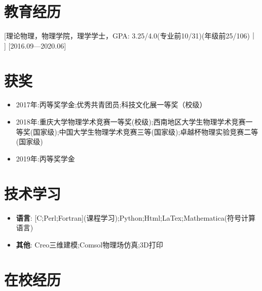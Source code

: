 \documentclass{resume}
\begin{document}


\ResumeTitle


\section{教育经历}

[\textnormal{理论物理，物理学院，理学学士，GPA: 3.25/4.0\small{(专业前10/31)(年级前25/106)}}｜ ]   [2016.09—2020.06]

\section{获奖}
\begin{itemize}
  \item 2017年:丙等奖学金;优秀共青团员;科技文化展一等奖（校级）
  \item 2018年:重庆大学物理学术竞赛一等奖(校级);西南地区大学生物理学术竞赛一等奖(国家级);中国大学生物理学术竞赛三等(国家级);卓越杯物理实验竞赛二等(国家级)
  \item 2019年:丙等奖学金
\end{itemize}

\section{技术学习}
\begin{itemize}
  \item \textbf{语言}: [C;Perl;Fortran](课程学习);Python;Html;LaTex;Mathematica(符号计算语言)
  \item \textbf{其他}: Creo三维建模;Comsol物理场仿真;3D打印
\end{itemize}

\section{在校经历}
\end{document}

